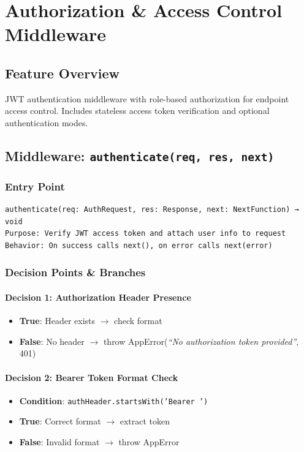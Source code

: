 \chapter{Authorization \& Access Control Middleware}

\section{Feature Overview}
JWT authentication middleware with role-based authorization for endpoint access control. Includes stateless access token verification and optional authentication modes.

\section{Middleware: \texttt{authenticate(req, res, next)}}

\subsection{Entry Point}
\begin{verbatim}
authenticate(req: AuthRequest, res: Response, next: NextFunction) → void
Purpose: Verify JWT access token and attach user info to request
Behavior: On success calls next(), on error calls next(error)
\end{verbatim}

\subsection{Decision Points \& Branches}

\subsubsection{Decision 1: Authorization Header Presence}
\begin{itemize}
    \item \textbf{True}: Header exists $\rightarrow$ check format
    \item \textbf{False}: No header $\rightarrow$ throw AppError(\textit{``No authorization token provided''}, 401)
\end{itemize}

\subsubsection{Decision 2: Bearer Token Format Check}
\begin{itemize}
    \item \textbf{Condition}: \texttt{authHeader.startsWith('Bearer ')}
    \item \textbf{True}: Correct format $\rightarrow$ extract token
    \item \textbf{False}: Invalid format $\rightarrow$ throw AppError
\end{itemize}

